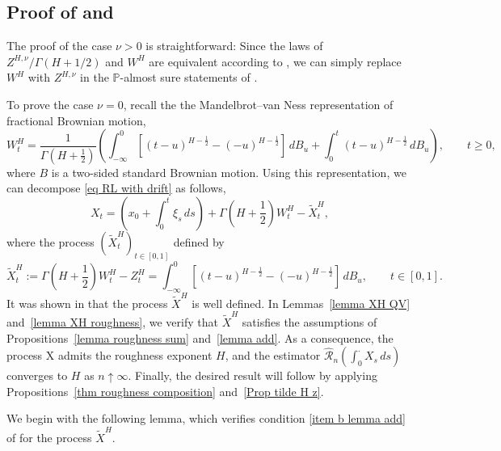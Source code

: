 \documentclass[12pt,reqno]{article}
\def\ua{\uparrow}
\def\wh{\widehat}
\def\wt{\widetilde}
\numberwithin{equation}{section}
\def\cR{{\mathscr R}}
\theoremstyle{definition}
\def\wt#1{\widetilde{#1}}
\def\ua{\uparrow}
\def\wh{\widehat}
\def\wt{\widetilde}
\newcommand{\bP}{\mathbb{P}}
\begin{document}
\subsection{Proof of  and }\label{Section Proof Bergomi}
The proof of the case $\nu > 0$ is straightforward: Since the laws of $Z^{H,\nu}/\Gamma(H + 1/2)$ and $W^H$ are equivalent according to \cite[Theorem 20]{PicardRepresentationFBM},  we can simply replace  $W^H$  with $Z^{H,\nu}$ in the $\bP$-almost sure statements of .

 To prove the case $\nu = 0$, recall the the Mandelbrot--van Ness representation of fractional Brownian motion,
\begin{equation*}
	W^H_t = \frac{1}{\Gamma(H + \frac{1}{2})}\left(\int_{-\infty}^{0}\left[(t-u)^{H-\frac{1}{2}} - (-u)^{H-\frac{1}{2}}\right]\,dB_u + \int_0^t (t-u)^{H-\frac{1}{2}}\,dB_u\right), \qquad t \ge 0,
\end{equation*}
where $B$ is a two-sided standard Brownian motion. Using this representation, we can decompose \eqref{eq RL with drift} as follows, 
\begin{equation*}
		X_t = \left(x_0 + \int_0^t \xi_s \, ds\right) + \Gamma\left(H + \frac{1}{2}\right)W^H_t - \wt X^H_t,
\end{equation*}
where the process $(\wt X^H_t)_{t \in [0,1]}$ defined by
\begin{equation}\label{eq XH 2}
	\wt X^H_t := \Gamma\left(H+\frac{1}{2}\right) W^H_t - Z^H_t = \int_{-\infty}^{0}\left[(t-u)^{H-\frac{1}{2}} - (-u)^{H-\frac{1}{2}}\right]\,dB_u, \qquad t \in [0,1].
\end{equation}
It was shown in \cite[Theorem 17]{PicardRepresentationFBM} that the process \(\wt X^H\) is well defined. In Lemmas~\ref{lemma XH QV} and~\ref{lemma XH roughness}, we verify that \(\wt X^H\) satisfies the assumptions of Propositions~\ref{lemma roughness sum} and~\ref{lemma add}. As a consequence, the process X admits the roughness exponent $H$, and the estimator \(\wh \cR_n\!\left(\int_0^\cdot X_s\,ds\right)\) converges to $H$ as \(n \ua \infty\). Finally, the desired result will follow by applying Propositions~\ref{thm roughness composition} and~\ref{Prop tilde H z}.


We begin with the following lemma, which verifies condition \ref{item b lemma add} of  for the process $\wt X^H$.
\end{document}
